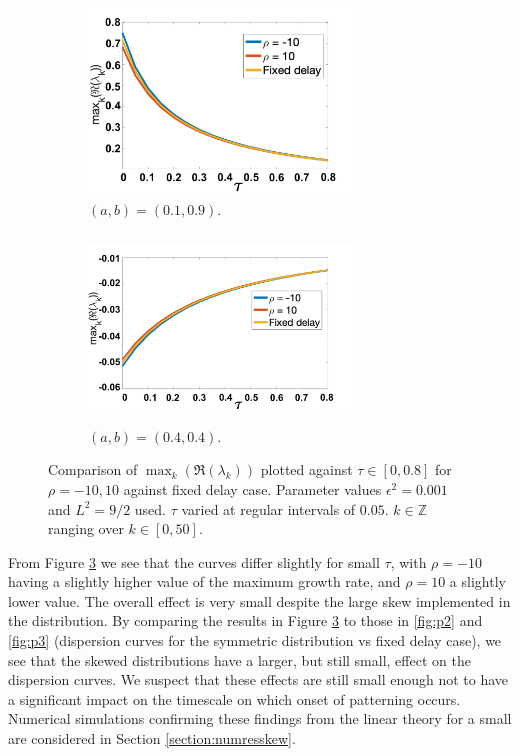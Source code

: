 \begin{figure}[H]
    \centering
    \begin{subfigure}[t]{0.45\textwidth}
        \centering
        \includegraphics[width=7cm,height=5cm]{dispskew.png}
        \caption{$(a,b)=(0.1,0.9)$.}
        \label{}
    \end{subfigure}
    \hfill
    \begin{subfigure}[t]{0.45\textwidth}
        \centering
        \includegraphics[width=7cm,height=5cm]{dispskew2.png}
        \caption{$(a,b)=(0.4,0.4)$.}
        \label{}
    \end{subfigure}
    \caption{Comparison of $\max_k(\Re(\lambda_k))$ plotted against $\tau\in[0,0.8]$ for $\rho=-10,10$ against fixed delay case. Parameter values $\epsilon^2=0.001$ and $L^2=9/2$ used. $\tau$ varied at regular intervals of $0.05$. $k\in\mathbb{Z}$ ranging over $k\in[0,50]$.}
    \label{fig:dispskew}
\end{figure}
From Figure \ref{fig:dispskew} we see that the curves differ slightly for small $\tau$, with $\rho=-10$ having a slightly higher value of the maximum growth rate, and $\rho=10$ a slightly lower value. The overall effect is very small despite the large skew implemented in the distribution. By comparing the results in Figure \ref{fig:dispskew} to those in \ref{fig:p2} and \ref{fig:p3} (dispersion curves for the symmetric distribution vs fixed delay case), we see that the skewed distributions have a larger, but still small, effect on the dispersion curves. We suspect that these effects are still small enough not to have a significant impact on the timescale on which onset of patterning occurs. Numerical simulations confirming these findings from the linear theory for a small are considered in Section \ref{section:numresskew}.


